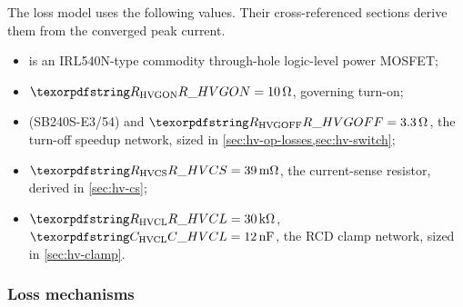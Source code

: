 The loss model uses the following values. Their cross-referenced sections
derive them from the converged peak current.
\begin{itemize}[nosep]
  \item {} is an IRL540N-type commodity through-hole logic-level power MOSFET;
  \item $\des{R}{HVGON} = \SI{10}{\ohm}$, governing turn-on;
  \item {} (SB240S-E3/54) and $\des{R}{HVGOFF} = \SI{3.3}{\ohm}$,
    the turn-off speedup network, sized in
    \cref{sec:hv-op-losses,sec:hv-switch};
  \item $\des{R}{HVCS} = \SI{39}{\milli\ohm}$, the current-sense resistor,
    derived in \cref{sec:hv-cs};
  \item $\des{R}{HVCL} = \SI{30}{\kilo\ohm}$, $\des{C}{HVCL} =
    \SI{12}{\nano\farad}$, the RCD clamp network, sized in
    \cref{sec:hv-clamp}.
\end{itemize}

\subsubsection{Loss mechanisms}\label{sec:hv-op-losses}

